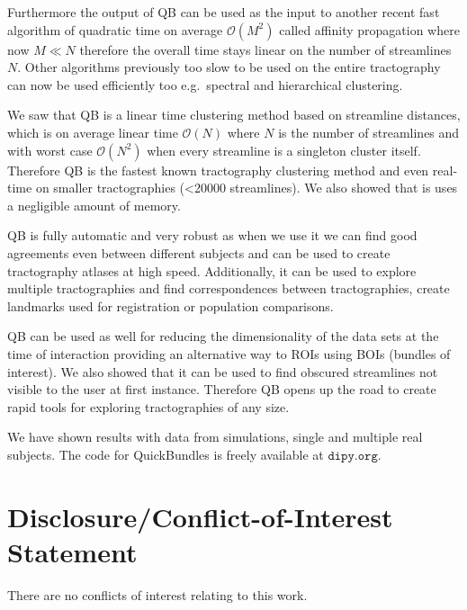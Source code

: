 \documentclass{bioinfo}
\begin{document}
Furthermore the output of QB can be used as the input to another recent
fast algorithm of quadratic time on average $\mathcal{O}(M^{2})$ called
affinity propagation where now $M\ll N$ therefore the overall time stays
linear on the number of streamlines $N$. Other algorithms previously too
slow to be used on the entire tractography can now be used efficiently
too e.g.~spectral and hierarchical clustering.

We saw that QB is a linear time clustering method based on streamline
distances, which is on average linear time $\mathcal{O}(N)$ where $N$ is
the number of streamlines and with worst case $\mathcal{O}(N^{2})$ when
every streamline is a singleton cluster itself. Therefore QB is the
fastest known tractography clustering method and even real-time on
smaller tractographies (<\num{20000} streamlines). We also showed that
is uses a negligible amount of memory.

QB is fully automatic and very robust as when we use it we can find good
agreements even between different subjects and can be used to create
tractography atlases at high speed. Additionally, it can be used to
explore multiple tractographies and find correspondences between
tractographies, create landmarks used for registration or population
comparisons.

QB can be used as well for reducing the dimensionality of the data sets
at the time of interaction providing an alternative way to ROIs using
BOIs (bundles of interest). We also showed that it can be used to find
obscured streamlines not visible to the user at first
instance. Therefore QB opens up the road to create rapid tools for
exploring tractographies of any size.

We have shown results with data from simulations, single and multiple
real subjects. The code for QuickBundles is freely available at
$\texttt{dipy.org}$.

\section*{Disclosure/Conflict-of-Interest Statement}
There are no conflicts of interest relating to this work.

%

%
%
%
%

\end{document}
